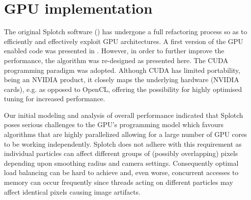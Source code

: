 \documentclass[11pt,twoside]{article}
\begin{document}
\section{GPU implementation}

The original Splotch software (\citet{2008NJPh...10l5006D}) has undergone a full refactoring process so as to
efficiently and effectively exploit GPU architectures. A first version of the GPU enabled code was presented in 
\citet{jin:high-performance}. However, in order to further improve the performance, the 
algorithm was re-designed as presented here. 
The CUDA programming paradigm was adopted. Although CUDA has limited portability, being an NVIDIA product, it closely maps the underlying hardware (NVIDIA cards), e.g. as opposed to OpenCL, offering the possibility for highly optimised tuning for increased performance.

Our initial modeling and analysis of overall performance indicated that
Splotch poses serious challenges
to the GPU's programming model which favours algorithms that are highly parallelized allowing for a large number of 
GPU cores to be working independently. Splotch does not adhere with this requirement as individual particles can affect different groups of (possibly overlapping) pixels depending upon smoothing radius and camera settings. Consequently optimal load balancing can be hard to achieve
and, even worse, concurrent accesses to memory can occur frequently since threads acting on different particles may
affect identical pixels causing image artifacts.
\end{document}
